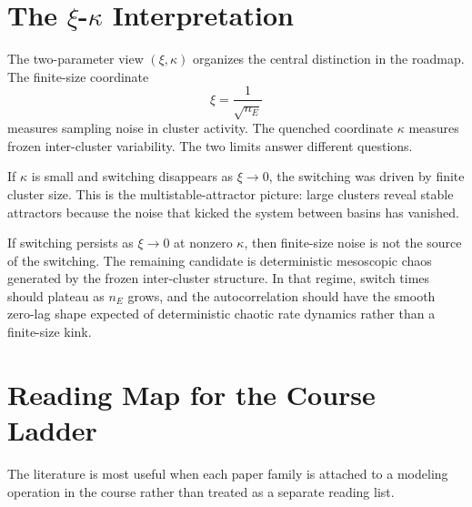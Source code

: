 \section[The xi-kappa Interpretation]{The \(\xi\)-\(\kappa\) Interpretation}
\label{sec:ch07-xi-kappa}

The two-parameter view \((\xi,\kappa)\) organizes the central distinction in the
roadmap. The finite-size coordinate
\[
        \xi = \frac{1}{\sqrt{n_E}}
\]
measures sampling noise in cluster activity. The quenched coordinate
\(\kappa\) measures frozen inter-cluster variability. The two limits answer
different questions.

If \(\kappa\) is small and switching disappears as \(\xi\to 0\), the switching
was driven by finite cluster size. This is the multistable-attractor picture:
large clusters reveal stable attractors because the noise that kicked the system
between basins has vanished.

If switching persists as \(\xi\to 0\) at nonzero \(\kappa\), then finite-size
noise is not the source of the switching. The remaining candidate is
deterministic mesoscopic chaos generated by the frozen inter-cluster structure.
In that regime, switch times should plateau as \(n_E\) grows, and the
autocorrelation should have the smooth zero-lag shape expected of deterministic
chaotic rate dynamics rather than a finite-size kink.

\section{Reading Map for the Course Ladder}
\label{sec:ch07-reading-map}

The literature is most useful when each paper family is attached to a modeling
operation in the course rather than treated as a separate reading list.

